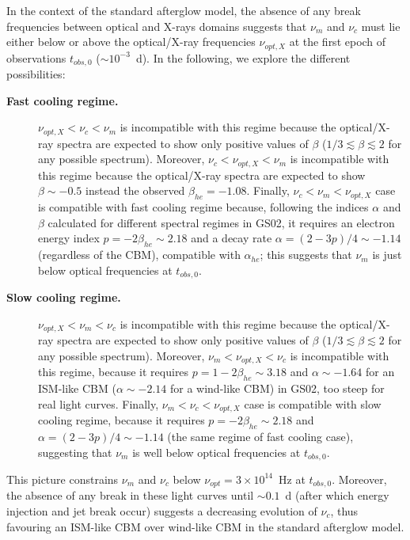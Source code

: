 \documentclass{aa}
\begin{document}
In the context of the standard afterglow model, the absence of any break frequencies between optical and X-rays domains suggests that $\nu_m$ and $\nu_c$ must lie either below or above the optical/X-ray frequencies $\nu_{opt,X}$ at the first epoch of observations $t_{obs,0}$ ($\sim 10^{-3}$~d).
In the following, we explore the different possibilities:
%
\begin{description}
\item[\textbf{Fast cooling regime.}] $\nu_{opt,X} < \nu_c < \nu_m$ is incompatible with this regime because the optical/X-ray spectra are expected to show only positive values of $\beta$ ($1/3 \lesssim \beta \lesssim 2$ for any possible spectrum).
Moreover, $\nu_c < \nu_{opt,X} < \nu_m$ is incompatible with this regime because the optical/X-ray spectra are expected to show $\beta \sim -0.5$ instead the observed $\beta_{he} = -1.08$.
Finally, $\nu_c < \nu_m < \nu_{opt,X}$ case is compatible with fast cooling regime because, following the indices $\alpha$ and $\beta$ calculated for different spectral regimes in GS02, it requires an electron energy index $p = -2\beta_{he} \sim 2.18$ and a decay rate $\alpha = (2-3p)/4 \sim -1.14$ (regardless of the CBM), compatible with $\alpha_{he}$; this suggests that $\nu_m$ is just below optical frequencies at $t_{obs,0}$.
%
\item[\textbf{Slow cooling regime.}] $\nu_{opt,X} < \nu_m < \nu_c$ is incompatible with this regime because the optical/X-ray spectra are expected to show only positive values of $\beta$ ($1/3 \lesssim \beta \lesssim 2$ for any possible spectrum).
Moreover, $\nu_m < \nu_{opt,X} < \nu_c$ is incompatible with this regime, because it requires $p = 1-2\beta_{he} \sim 3.18$ and $\alpha \sim - 1.64$ for an ISM-like CBM ($\alpha \sim - 2.14$ for a wind-like CBM) in GS02, too steep for real light curves.
Finally, $\nu_m < \nu_c < \nu_{opt,X}$ case is compatible with slow cooling regime, because it requires $p = -2\beta_{he} \sim 2.18$ and $\alpha = (2-3p)/4 \sim -1.14$ (the same regime of fast cooling case), suggesting that $\nu_m$ is well below optical frequencies at $t_{obs,0}$.
\end{description}

This picture constrains $\nu_m$ and $\nu_c$ below $\nu_{opt} = 3 \times 10^{14}$~Hz at $t_{obs,0}$.
Moreover, the absence of any break in these light curves until $\sim 0.1$~d (after which energy injection and jet break occur) suggests a decreasing evolution of $\nu_c$, thus favouring an ISM-like CBM over wind-like CBM in the standard afterglow model.
\end{document}
